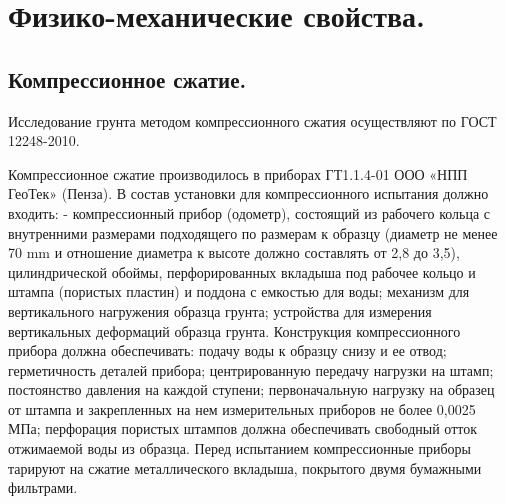 \section{Физико-механические свойства.}\label{sec:ch6/sec2}

\subsection{Компрессионное сжатие.}

Исследование грунта методом компрессионного сжатия осуществляют по ГОСТ 12248-2010.


Компрессионное сжатие производилось в приборах ГТ1.1.4-01 ООО «НПП ГеоТек» (Пенза).
В состав установки для компрессионного испытания должно входить: 
- компрессионный прибор (одометр), состоящий из рабочего кольца с
внутренними размерами подходящего по размерам к образцу (диаметр не менее 70 \si{\milli\meter} 
и отношение диаметра к высоте должно составлять от 2,8 до 3,5), цилиндрической обоймы,
перфорированных вкладыша под рабочее кольцо и штампа (пористых
пластин) и поддона с емкостью для воды; механизм для вертикального нагружения образца грунта; 
устройства для измерения вертикальных деформаций образца грунта.
Конструкция компрессионного прибора должна обеспечивать: подачу воды к образцу снизу и ее отвод; 
герметичность деталей прибора; центрированную передачу нагрузки на штамп; постоянство давления 
на каждой ступени; первоначальную нагрузку на образец от штампа и закрепленных на нем
измерительных приборов не более 0,0025 МПа; перфорация пористых штампов должна 
обеспечивать свободный отток отжимаемой воды из образца.
Перед испытанием компрессионные приборы тарируют на сжатие металлического 
вкладыша, покрытого двумя бумажными фильтрами.

